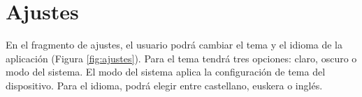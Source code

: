 \documentclass[a4paper,12pt]{report}
\begin{document}
\section{Ajustes}
  En el fragmento de ajustes, el usuario podrá cambiar el tema y el idioma de la aplicación (Figura \ref{fig:ajustes}). Para el tema tendrá tres opciones: claro, oscuro o modo del sistema. El modo del sistema aplica la configuración de tema del dispositivo. Para el idioma, podrá elegir entre castellano, euskera o inglés.

\begin{figure}[H]
  \centering

\end{figure}
\end{document}
